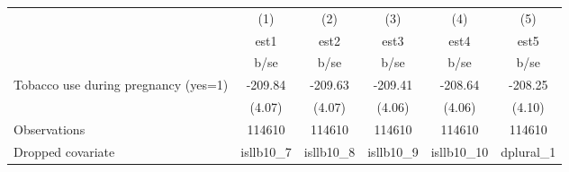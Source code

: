 {
\def\sym#1{\ifmmode^{#1}\else\(^{#1}\)\fi}
\begin{tabular}{l*{5}{c}}
\hline\hline
                                                  &\multicolumn{1}{c}{(1)}&\multicolumn{1}{c}{(2)}&\multicolumn{1}{c}{(3)}&\multicolumn{1}{c}{(4)}&\multicolumn{1}{c}{(5)}\\
                                                  &        est1&        est2&        est3&        est4&        est5\\
                                                  &        b/se&        b/se&        b/se&        b/se&        b/se\\
\hline
Tobacco use during pregnancy (yes=1)              &     -209.84&     -209.63&     -209.41&     -208.64&     -208.25\\
                                                  &      (4.07)&      (4.07)&      (4.06)&      (4.06)&      (4.10)\\
\hline
Observations                                      &      114610&      114610&      114610&      114610&      114610\\
Dropped covariate                                 &   isllb10\_7&   isllb10\_8&   isllb10\_9&  isllb10\_10&   dplural\_1\\
\hline\hline
\end{tabular}
}
